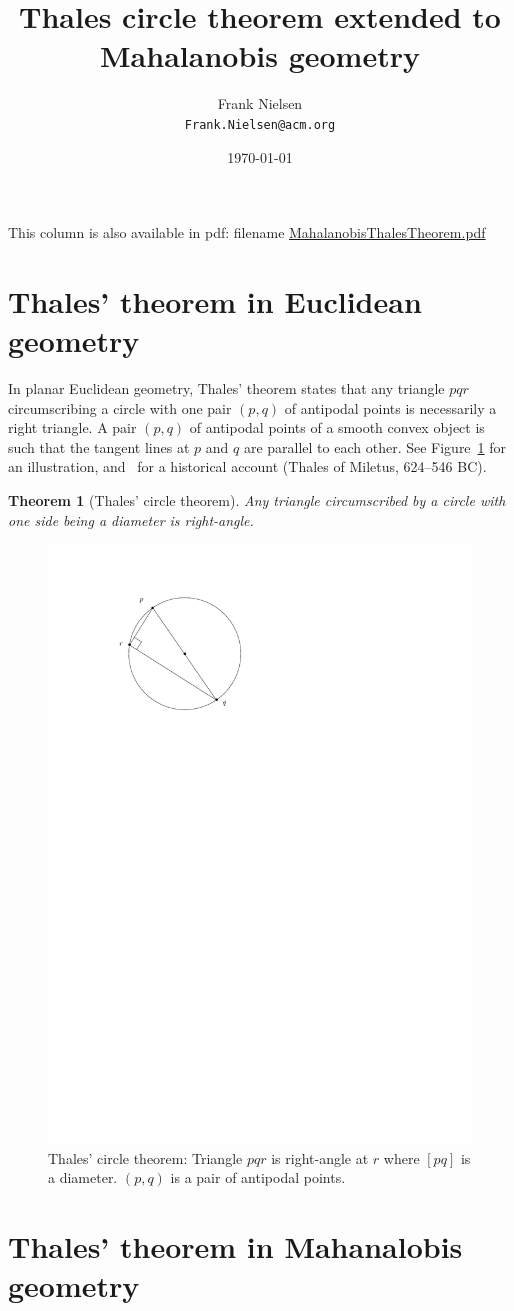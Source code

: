 \documentclass{article}
\newtheorem{theorem}{Theorem}
\begin{document}
\title{Thales circle theorem extended to Mahalanobis geometry}

\author{Frank Nielsen\\ {\tt Frank.Nielsen@acm.org}}
\date{\today}
\maketitle

 This column is also available in pdf: filename \url{MahalanobisThalesTheorem.pdf} 
\vskip 0.5cm


\section{Thales' theorem in Euclidean geometry}

In  planar Euclidean geometry, Thales' theorem  states that any triangle $pqr$  circumscribing a circle with one pair $(p,q)$ of antipodal points is necessarily 
a right triangle. 
A pair $(p,q)$ of antipodal points of a smooth convex object is such that the tangent lines at $p$ and $q$ are parallel to each other.
See Figure~\ref{fig:thales} for an illustration, and~\cite{Thales-2015} for a historical account (Thales of Miletus, 624--546 BC).

\begin{theorem}[Thales' circle theorem]
Any triangle circumscribed by a circle with one side being a diameter is right-angle.
\end{theorem}

\begin{figure}%
\centering
\includegraphics[width=0.3\columnwidth]{Fig-ThalesTheorem.pdf}%
\caption{Thales' circle theorem: Triangle $pqr$ is right-angle at $r$ where $[pq]$ is a diameter. $(p,q)$ is a pair of antipodal points.}%
\label{fig:thales}%
\end{figure}


\section{Thales' theorem in Mahanalobis geometry}
\end{document}
